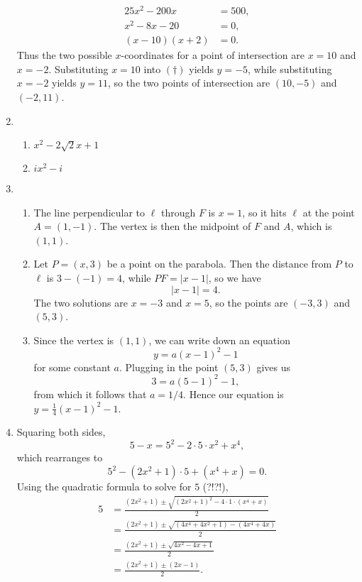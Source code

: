 \begin{enumerate}
\begin{align*}
25x^2 - 200x &= 500, \\
x^2 - 8x - 20 &= 0, \\
(x - 10)(x + 2) &= 0.
\end{align*}
Thus the two possible $x$-coordinates for a point of intersection are $x = 10$ and $x = -2$. Substituting $x = 10$ into $(\dagger)$ yields $y = -5$, while substituting $x = -2$ yields $y = 11$, so the two points of intersection are $\boxed{(10, -5)}$ and $\boxed{(-2, 11)}$.
\item \begin{enumerate}
\item $x^2 - 2\sqrt{2}x + 1$
\item $ix^2 - i$
\end{enumerate}
\item \begin{enumerate}
\item The line perpendicular to $\ell$ through $F$ is $x = 1$, so it hits $\ell$ at the point $A = (1,-1)$. The vertex is then the midpoint of $F$ and $A$, which is $\boxed{(1,1)}$.
\item Let $P = (x,3)$ be a point on the parabola. Then the distance from $P$ to $\ell$ is $3 - (-1) = 4$, while $PF = \lvert x - 1\rvert$, so we have
\begin{equation*}
\lvert x - 1\rvert = 4.
\end{equation*}
The two solutions are $x = -3$ and $x = 5$, so the points are $\boxed{(-3,3)}$ and $\boxed{(5,3)}$.
\item Since the vertex is $(1,1)$, we can write down an equation
\begin{equation*}
y = a(x - 1)^2 - 1
\end{equation*}
for some constant $a$. Plugging in the point $(5,3)$ gives us
\begin{equation*}
3 = a(5 - 1)^2 - 1,
\end{equation*}
from which it follows that $a = 1/4$. Hence our equation is $\boxed{y = \frac{1}{4}(x - 1)^2 - 1}$.
\end{enumerate}
\item Squaring both sides,
\begin{equation*}
5 - x = 5^2 - 2\cdot 5\cdot x^2 + x^4,
\end{equation*}
which rearranges to
\begin{equation*}
5^2 - (2x^2 + 1)\cdot 5 + (x^4 + x) = 0.
\end{equation*}
Using the quadratic formula to solve for $5$ (?!?!),
\begin{align*}
5 &= \frac{(2x^2 + 1)\pm\sqrt{(2x^2 + 1)^2 - 4\cdot 1\cdot (x^4 + x)}}{2} \\
&= \frac{(2x^2 + 1)\pm\sqrt{(4x^4 + 4x^2 + 1) - (4x^4 + 4x)}}{2} \\
&= \frac{(2x^2 + 1)\pm\sqrt{4x^2 - 4x + 1}}{2} \\
&= \frac{(2x^2 + 1)\pm (2x - 1)}{2}.
\end{align*}
\end{enumerate}